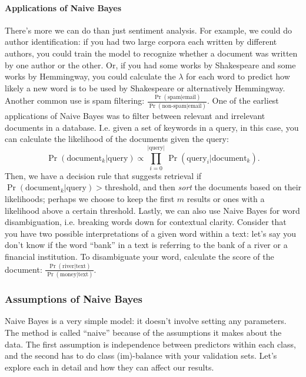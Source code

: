\documentclass[12pt]{article}
\begin{document}
\paragraph{Applications of Naive Bayes} There's more we can do than just sentiment analysis. For example, we could do author identification: if you had two large corpora each written by different authors, you could train the model to recognize whether a document was written by one author or the other. Or, if you had some works by Shakespeare and some works by Hemmingway, you could calculate the $\lambda$ for each word to predict how likely a new word is to be used by Shakespeare or alternatively Hemmingway. Another common use is spam filtering: $\frac{\Pr(\textrm{spam} | \textrm{email})}{\Pr(\textrm{non-spam}|\textrm{email})}$. One of the earliest applications of Naive Bayes was to filter between relevant and irrelevant documents in a database. I.e. given a set of keywords in a query, in this case, you can calculate the likelihood of the documents given the query:
\[
  \Pr(\textrm{document}_k | \textrm{query}) \propto \prod_{i=0}^{|\textrm{query}|} \Pr(\textrm{query}_i | \textrm{document}_k).
\]
Then, we have a decision rule that suggests retrieval if $\Pr(\textrm{document}_k | \textrm{query}) > \textrm{threshold}$, and then \emph{sort} the documents based on their likelihoods; perhaps we choose to keep the first $m$ results or ones with a likelihood above a certain threshold. Lastly, we can also use Naive Bayes for word disambiguation, i.e. breaking words down for contextual clarity. Consider that you have two possible interpretations of a given word within a text: let's say you don't know if the word ``bank'' in a text is referring to the bank of a river or a financial institution. To disambiguate your word, calculate the score of the document: $\frac{\Pr(\textrm{river} | \textrm{text})}{\Pr(\textrm{money} |   \textrm{text})}$.

\subsubsection{Assumptions of Naive Bayes} Naive Bayes is a very simple model: it doesn't involve setting any parameters. The method is called ``naive'' because of the assumptions it makes about the data. The first assumption is independence between predictors within each class, and the second has to do class (im)-balance with your validation sets. Let's explore each in detail and how they can affect our results.
\end{document}
